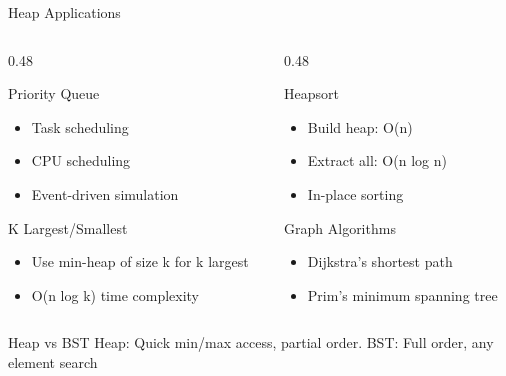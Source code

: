 \documentclass[aspectratio=169,xcolor=dvipsnames]{beamer}
\begin{document}
\begin{frame}{Heap Applications}
  \begin{columns}
    \begin{column}{0.48\textwidth}
      \begin{block}{Priority Queue}
        \begin{itemize}
          \item Task scheduling
          \item CPU scheduling
          \item Event-driven simulation
        \end{itemize}
      \end{block}

      \begin{block}{K Largest/Smallest}
        \begin{itemize}
          \item Use min-heap of size k for k largest
          \item O(n log k) time complexity
        \end{itemize}
      \end{block}
    \end{column}
    \begin{column}{0.48\textwidth}
      \begin{block}{Heapsort}
        \begin{itemize}
          \item Build heap: O(n)
          \item Extract all: O(n log n)
          \item In-place sorting
        \end{itemize}
      \end{block}

      \begin{block}{Graph Algorithms}
        \begin{itemize}
          \item Dijkstra's shortest path
          \item Prim's minimum spanning tree
        \end{itemize}
      \end{block}
    \end{column}
  \end{columns}

  \vspace{0.3cm}

  \begin{alertblock}{Heap vs BST}
    Heap: Quick min/max access, partial order. BST: Full order, any element search
  \end{alertblock}
\end{frame}
\end{document}
